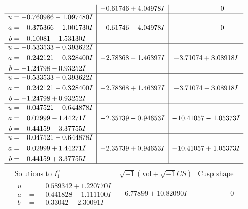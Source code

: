\documentclass[1p]{elsarticle_modified}
\theoremstyle{definition}
\newcommand{\I}{\sqrt{-1}}
\begin{document}
$$\begin{array}{c|c|c}
 & -0.61746 + 4.04978 I & \phantom{-0.000000 } 0 \\ \hline\begin{aligned}
u &= -0.760986 - 1.097480 I \\
a &= -0.375366 - 1.001730 I \\
b &= \phantom{-}0.10081 - 1.53130 I\end{aligned}
 & -0.61746 - 4.04978 I & \phantom{-0.000000 } 0 \\ \hline\begin{aligned}
u &= -0.533533 + 0.393622 I \\
a &= \phantom{-}0.242121 + 0.328400 I \\
b &= -1.24798 - 0.93252 I\end{aligned}
 & -2.78368 - 1.46397 I & -3.71074 + 3.08918 I \\ \hline\begin{aligned}
u &= -0.533533 - 0.393622 I \\
a &= \phantom{-}0.242121 - 0.328400 I \\
b &= -1.24798 + 0.93252 I\end{aligned}
 & -2.78368 + 1.46397 I & -3.71074 - 3.08918 I \\ \hline\begin{aligned}
u &= \phantom{-}0.047521 + 0.644878 I \\
a &= \phantom{-}0.02999 - 1.44271 I \\
b &= -0.44159 - 3.37755 I\end{aligned}
 & -2.35739 - 0.94653 I & -10.41057 - 1.05373 I \\ \hline\begin{aligned}
u &= \phantom{-}0.047521 - 0.644878 I \\
a &= \phantom{-}0.02999 + 1.44271 I \\
b &= -0.44159 + 3.37755 I\end{aligned}
 & -2.35739 + 0.94653 I & -10.41057 + 1.05373 I\\
 \hline 
 \end{array}$$\newpage$$\begin{array}{c|c|c}  
\text{Solutions to }I^u_{1}& \I (\text{vol} + \sqrt{-1}CS) & \text{Cusp shape}\\
 \hline 
\begin{aligned}
u &= \phantom{-}0.589342 + 1.220770 I \\
a &= \phantom{-}0.441828 - 1.111100 I \\
b &= \phantom{-}0.33042 - 2.30091 I\end{aligned}
 & -6.77899 + 10.82090 I & \phantom{-0.000000 } 0 \\ \hline\begin{aligned}

\end{aligned}
\end{array}$$
\end{document}
